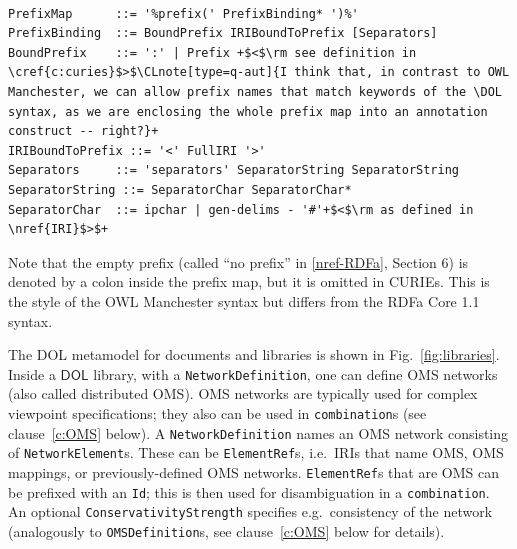 \documentclass[10pt, a4paper]{isov2}
\makeatletter
\newcommand*\CommentAuthor{}
\renewcommand*\CommentAuthor{#1}}
\newcommand*\CommentDate{}
\renewcommand*\CommentDate{#1}}
\newcommand*\CommentId{}
\renewcommand*\CommentId{#1}}
\newcommand*\CommentType{}
\renewcommand*\CommentType{#1}}
\newcommand*{\SetCommentColorByType}[1]{%
\edef\localType{{#1}}%
\expandafter\ifstrequal\localType{q-aut}{\colorlet{CommentColor}{red}}{%
\expandafter\ifstrequal\localType{q-all}{\colorlet{CommentColor}{orange}}{%
\expandafter\ifstrequal\localType{todo}{\colorlet{CommentColor}{orange}}{%
\expandafter\ifstrequal\localType{fyi}{\colorlet{CommentColor}{lightgray}}{%
\colorlet{CommentColor}{yellow}}}}}}
\newcommand*{\SetCommentPrefixByType}[1]{%
\edef\localType{{#1}}%
\expandafter\@ifmtarg\localType{%
\edef\CommentPrefix{}%
}{%
\caseupper[q]{#1}%
\edef\CommentPrefix{\thestring: }%
}}
\newcommand*{\initComment}[1]{%
\setkeys{Comment}{#1}%
\SetCommentColorByType{\CommentType}%
\relax%
\SetCommentPrefixByType{\CommentType}%
\relax%
}
\newcommand*{\todonote}[2][]{%
\initComment{#1}%
\pdfcomment[author=\CommentAuthor,color=CommentColor,date=\CommentDate,id=\CommentId]{%
\CommentPrefix
#2}}
\renewcommand*{\todonote}[2][]{%
\initComment{#1}%
\ednote{\CommentPrefix #2}}
\newcommand*{\CLnote}[2][author=Christoph Lange]{%
\todonote[author=Christoph Lange,#1]{#2}}
\newcommand*{\syntax}[1]{\texttt{#1}}
\newcommand*{\DOL}{\ensuremath{\mathsf{DOL}}\xspace}
\renewcommand{\clauserefname}{clause}
\renewcommand{\noterefname}{note}
\renewcommand{\cref}[1]{\clauserefname~\ref{#1}}
\renewcommand{\nref}[1]{\noterefname~\ref{#1}}
\renewcommand{\nref}[1]{\ref{nref-#1}}
\makeatother
\begin{document}
\begin{lstlisting}[language=ebnf,escapechar=+,morecomment={[l]{\%\%\ }}]

PrefixMap      ::= '%prefix(' PrefixBinding* ')%'
PrefixBinding  ::= BoundPrefix IRIBoundToPrefix [Separators]
BoundPrefix    ::= ':' | Prefix +$<$\rm see definition in \cref{c:curies}$>$\CLnote[type=q-aut]{I think that, in contrast to OWL Manchester, we can allow prefix names that match keywords of the \DOL syntax, as we are enclosing the whole prefix map into an annotation construct -- right?}+
IRIBoundToPrefix ::= '<' FullIRI '>'
Separators     ::= 'separators' SeparatorString SeparatorString
SeparatorString ::= SeparatorChar SeparatorChar*
SeparatorChar  ::= ipchar | gen-delims - '#'+$<$\rm as defined in \nref{IRI}$>$+
\end{lstlisting}


 Note that the empty prefix (called ``no prefix'' in \nref{RDFa}, Section 6) is denoted by a colon inside the prefix map, but it is omitted in CURIEs.  This is the style of the OWL Manchester syntax \cite{W3C:NOTE-owl2-manchester-syntax-20091027} but differs from the RDFa Core 1.1 syntax.

\vspace{1em}




\label{c:networks}


The DOL metamodel for documents and libraries is shown in Fig.~\ref{fig:libraries}.
Inside a \DOL library, with a \syntax{NetworkDefinition}, one can
define OMS networks (also called distributed OMS). OMS networks are
typically used for complex viewpoint specifications; they also can be
used in \syntax{combination}s (see clause~\ref{c:OMS} below). A
\syntax{NetworkDefinition} names an OMS network consisting of
\syntax{NetworkElement}s. These can be \syntax{ElementRef}s,
i.e.\ IRIs that name OMS, OMS mappings, or previously-defined OMS
networks. \syntax{ElementRef}s that are OMS can be prefixed with an
\syntax{Id}; this is then used for disambiguation in a
\syntax{combination}.  An optional \syntax{ConservativityStrength}
specifies e.g.\ consistency of the network (analogously to
\syntax{OMSDefinition}s, see clause~\ref{c:OMS} below for details).
\end{document}
